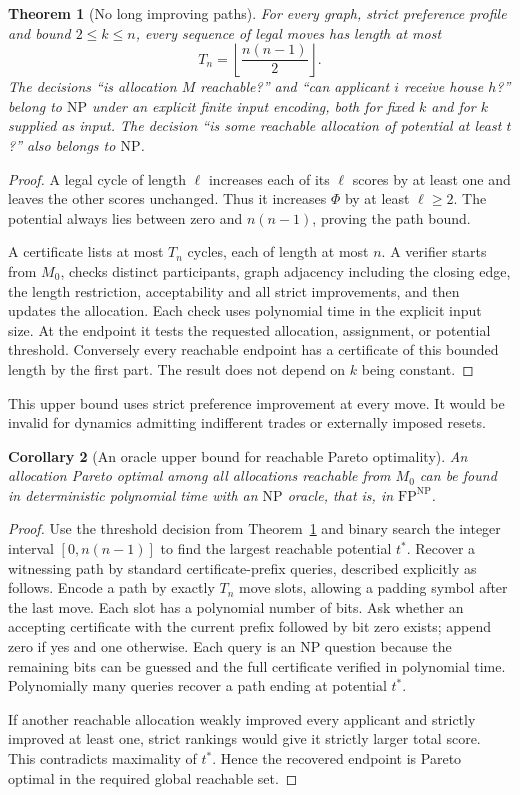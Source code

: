 \documentclass[11pt,a4paper]{article}
\newtheorem{theorem}{Theorem}[section]
\newtheorem{corollary}[theorem]{Corollary}
\theoremstyle{definition}
\theoremstyle{remark}
\begin{document}
\begin{theorem}[No long improving paths]\label{th:length}
For every graph, strict preference profile and bound $2\leq k\leq n$, every sequence of legal moves has length at most
\[
 T_n=\left\lfloor\frac{n(n-1)}2\right\rfloor.
\]
The decisions ``is allocation $M$ reachable?'' and ``can applicant $i$ receive house $h$?'' belong to $\mathrm{NP}$ under an explicit finite input encoding, both for fixed $k$ and for $k$ supplied as input. The decision ``is some reachable allocation of potential at least $t$?'' also belongs to $\mathrm{NP}$.
\end{theorem}
\begin{proof}
A legal cycle of length $\ell$ increases each of its $\ell$ scores by at least one and leaves the other scores unchanged. Thus it increases $\Phi$ by at least $\ell\geq2$. The potential always lies between zero and $n(n-1)$, proving the path bound.

A certificate lists at most $T_n$ cycles, each of length at most $n$. A verifier starts from $M_0$, checks distinct participants, graph adjacency including the closing edge, the length restriction, acceptability and all strict improvements, and then updates the allocation. Each check uses polynomial time in the explicit input size. At the endpoint it tests the requested allocation, assignment, or potential threshold. Conversely every reachable endpoint has a certificate of this bounded length by the first part. The result does not depend on $k$ being constant.
\end{proof}

This upper bound uses strict preference improvement at every move. It would be invalid for dynamics admitting indifferent trades or externally imposed resets.

\begin{corollary}[An oracle upper bound for reachable Pareto optimality]\label{co:oracle}
An allocation Pareto optimal among all allocations reachable from $M_0$ can be found in deterministic polynomial time with an $\mathrm{NP}$ oracle, that is, in $\mathrm{FP}^{\mathrm{NP}}$.
\end{corollary}
\begin{proof}
Use the threshold decision from Theorem~\ref{th:length} and binary search the integer interval $[0,n(n-1)]$ to find the largest reachable potential $t^*$. Recover a witnessing path by standard certificate-prefix queries, described explicitly as follows. Encode a path by exactly $T_n$ move slots, allowing a padding symbol after the last move. Each slot has a polynomial number of bits. Ask whether an accepting certificate with the current prefix followed by bit zero exists; append zero if yes and one otherwise. Each query is an NP question because the remaining bits can be guessed and the full certificate verified in polynomial time. Polynomially many queries recover a path ending at potential $t^*$.

If another reachable allocation weakly improved every applicant and strictly improved at least one, strict rankings would give it strictly larger total score. This contradicts maximality of $t^*$. Hence the recovered endpoint is Pareto optimal in the required global reachable set.
\end{proof}
\end{document}
